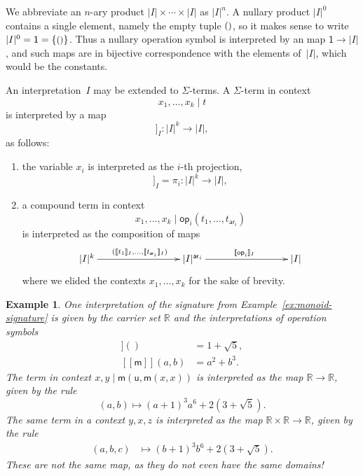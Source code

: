 \documentclass{amsart}
\newcommand{\RR}{\mathbb{R}} %
\newcommand{\carrier}[1]{|#1|} %
\newcommand{\set}[1]{\{#1\}} %
\newcommand{\op}[1]{\mathsf{op}_{#1}} %
\newcommand{\arity}[1]{\mathsf{ar}_{#1}} %
\newcommand{\one}{\mathsf{1}} %
\newcommand{\unit}{{\text{\small$()$}}} %
\newcommand{\sem}[1]{[\![#1]\!]} %
\newtheorem{example}[definition]{Example}
\begin{document}
We abbreviate an $n$-ary product $\carrier{I} \times \cdots \times \carrier{I}$ as $\carrier{I}^n$. A
nullary product $\carrier{I}^0$ contains a single element, namely the empty tuple
$\unit$, so it makes sense to write $\carrier{I}^0 = \one = \set{\unit}$. Thus a nullary
operation symbol is interpreted by an map $\one \to \carrier{I}$, and such maps are in
bijective correspondence with the elements of~$\carrier{I}$, which would be the constants.

An interpretation~$I$ may be extended to $\Sigma$-terms. A $\Sigma$-term in context
%
\begin{equation*}
  x_1, \ldots, x_k \mid t
\end{equation*}
%
is interpreted by a map
%
\begin{equation*}
  \sem{x_1, \ldots, x_k \mid t}_I : \carrier{I}^k \to \carrier{I},
\end{equation*}
%
as follows:
%
\begin{enumerate}
\item the variable $x_i$ is interpreted as the $i$-th projection,
  \begin{equation*}
    \sem{x_1, \ldots, x_k \mid  x_i}_I = \pi_i : \carrier{I}^k \to \carrier{I},
  \end{equation*}
\item a compound term in context
  \begin{equation*}
    x_1, \ldots, x_k \mid \op{i}(t_1, \ldots, t_{\arity{i}})
  \end{equation*}
  is interpreted as the composition of maps
  \begin{equation*}
    \xymatrix@+6em{
      {\carrier{I}^k} \ar[r]^{(\sem{t_1}_I, \ldots, \sem{t_{\arity{i}}}_I)}
      &
      {\carrier{I}^{\arity{i}}} \ar[r]^{\sem{\op{i}}_I}
      &
      {\carrier{I}}
    }
  \end{equation*}
  where we elided the contexts $x_1, \ldots, x_k$ for the sake of brevity.
\end{enumerate}

\begin{example}
  One interpretation of the signature from Example~\ref{ex:monoid-signature} is given by
  the carrier set $\RR$ and the interpretations of operation symbols
  \begin{align*}
    \sem{\mathsf{u}}() &= 1 + \sqrt{5}, \\
    \sem{\mathsf{m}}(a, b) &= a^2 + b^3.
  \end{align*}
  The term in context $x, y \mid \mathsf{m}(\mathsf{u}, \mathsf{m}(x, x))$ is interpreted
  as the map $\RR \to \RR$, given by the rule
  \begin{equation*}
    (a, b) \mapsto (a+1)^3 a^6 + 2 (3 + \sqrt{5}).
  \end{equation*}
  The same term in a context $y, x, z$ is interpreted as the map $\RR \times \RR \to \RR$,
  given by the rule
  \begin{align*}
    (a, b, c) &\mapsto (b+1)^3 b^6 + 2 (3 + \sqrt{5}).
  \end{align*}
  These are not the same map, as they do not even have the same domains!
\end{example}
\end{document}
